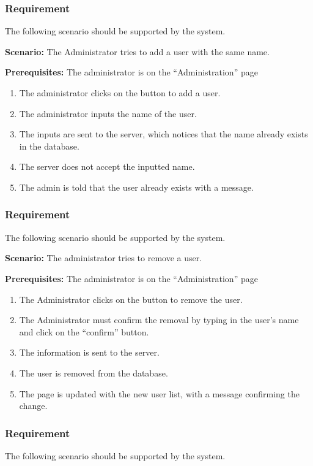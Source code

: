 \documentclass{article}
\begin{document}
\subsubsection{Requirement}
The following scenario should be supported by the system.

\textbf{Scenario:} The Administrator tries to add a user with the same name.

\textbf{Prerequisites:} The administrator is on the “Administration” page

\begin{enumerate}
    \item The administrator clicks on the button to add a user.
    \item The administrator inputs the name of the user.
    \item The inputs are sent to the server, which notices that the name already exists in the database.
    \item The server does not accept the inputted name.
    \item The admin is told that the user already exists with a message.
\end{enumerate}

\subsubsection{Requirement}
The following scenario should be supported by the system.

\textbf{Scenario:} The administrator tries to remove a user.

\textbf{Prerequisites:} The administrator is on the “Administration” page

\begin{enumerate}
    \item The Administrator clicks on the button to remove the user.
    \item The Administrator must confirm the removal by typing in the user’s name and click on the “confirm” button.
    \item The information is sent to the server.
    \item The user is removed from the database.
    \item The page is updated with the new user list, with a message confirming the change.
\end{enumerate}

\subsubsection{Requirement}
The following scenario should be supported by the system.
\end{document}
